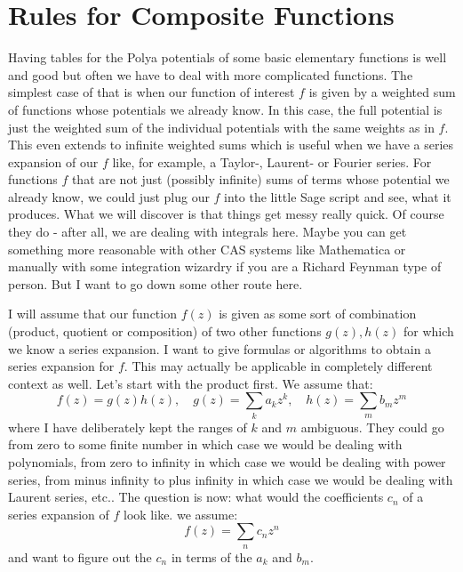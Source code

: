 \documentclass[12pt]{article}
\begin{document}

\section{Rules for Composite Functions}
Having tables for the Polya potentials of some basic elementary functions is well and good but often we have to deal with more complicated functions. The simplest case of that is when our function of interest $f$ is given by a weighted sum of functions whose potentials we already know. In this case, the full potential is just the weighted sum of the individual potentials with the same weights as in $f$. This even extends to infinite weighted sums which is useful when we have a series expansion of our $f$ like, for example, a Taylor-, Laurent- or Fourier series. For functions $f$ that are not just (possibly infinite) sums of terms whose potential we already know, we could just plug our $f$ into the little Sage script and see, what it produces. What we will discover is that things get messy really quick. Of course they do - after all, we are dealing with integrals here. Maybe you can get something more reasonable with other CAS systems like Mathematica or manually with some integration wizardry if you are a Richard Feynman type of person. But I want to go down some other route here.

\medskip
I will assume that our function $f(z)$ is given as some sort of combination (product, quotient or composition) of two other functions $g(z), h(z)$ for which we know a series expansion. I want to give formulas or algorithms to obtain a series expansion for $f$. This may actually be applicable in completely different context as well. Let's start with the product first. We assume that:
\begin{equation}
f(z) = g(z) h(z), \quad
g(z) = \sum_k a_k z^k, \quad
h(z) = \sum_m b_m z^m
\end{equation}
where I have deliberately kept the ranges of $k$ and $m$ ambiguous. They could go from zero to some finite number in which case we would be dealing with polynomials, from zero to infinity in which case we would be dealing with power series, from minus infinity to plus infinity in which case we would be dealing with Laurent series, etc.. The question is now: what would the coefficients $c_n$ of a series expansion of $f$ look like. we assume:
\begin{equation}
f(z) = \sum_n c_n z^n
\end{equation}
and want to figure out the $c_n$ in terms of the $a_k$ and $b_m$.
\end{document}
